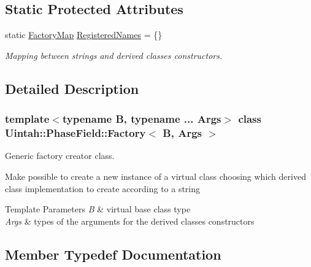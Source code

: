 \subsection*{Static Protected Attributes}
\begin{DoxyCompactItemize}
\item 
static \hyperlink{classUintah_1_1PhaseField_1_1Factory_aedb6067c58282efa01a12ad72414e0ac}{Factory\+Map} \hyperlink{classUintah_1_1PhaseField_1_1Factory_a22f376fae678b41bc28047d7e517e622}{Registered\+Names} = \{\}
\begin{DoxyCompactList}\small\item\em Mapping between strings and derived classes constructors. \end{DoxyCompactList}\end{DoxyCompactItemize}


\subsection{Detailed Description}
\subsubsection*{template$<$typename B, typename ... Args$>$\newline
class Uintah\+::\+Phase\+Field\+::\+Factory$<$ B, Args $>$}

Generic factory creator class. 

Make possible to create a new instance of a virtual class choosing which derived class implementation to create according to a string


\begin{DoxyTemplParams}{Template Parameters}
{\em B} & virtual base class type \\
\hline
{\em Args} & types of the arguments for the derived classes constructors \\
\hline
\end{DoxyTemplParams}


\subsection{Member Typedef Documentation}
\mbox{\label{classUintah_1_1PhaseField_1_1Factory_aedb6067c58282efa01a12ad72414e0ac}} 
